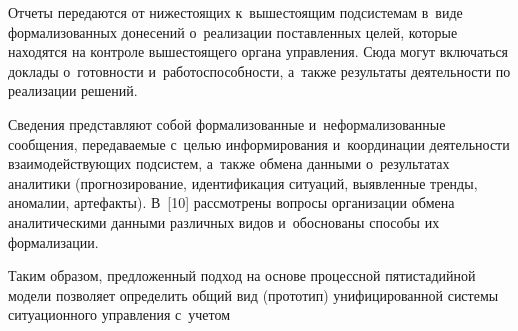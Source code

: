 \begin{multicols}{2}
    Отчеты передаются от нижестоящих к~вышестоящим подсистемам 
    в~виде формализованных донесений о~реализации поставленных целей, 
которые находятся на контроле вышестоящего органа управления. Сюда 
могут включаться доклады о~готовности и~работоспособности, а~также 
результаты деятельности по реализации решений.
    
    Сведения представляют собой формализованные и~неформализованные 
сообщения, пе\-ре\-да\-ва\-емые с~целью информирования и~координации 
деятельности взаимодействующих под\-сис\-тем, а~также обмена данными 
о~результатах  аналитики (прогнозирование, идентификация ситуаций, 
выявленные тренды, аномалии, артефакты). В~[10] рас\-смот\-ре\-ны  вопросы 
организации обмена аналитическими данными различных видов 
и~обосно\-ва\-ны способы их формализации.
    
    Таким образом, предложенный подход на основе процессной 
пятистадийной модели позволяет определить общий вид (прототип) 
унифицированной  сис\-те\-мы ситуационного управ\-ле\-ния с~учетом\linebreak\vspace*{-12pt}

\pagebreak

\end{multicols}

\begin{figure*} %
\vspace*{1pt}
 \begin{center}
 \mbox{%
 \epsfxsize=161.434mm 
 }
 \end{center}
\vspace*{-8pt}
\end{figure*}
    

